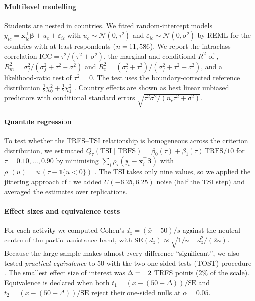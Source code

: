 \documentclass[pdflatex,sn-basic]{sn-jnl}%
\theoremstyle{plain}
\theoremstyle{remark}
\begin{document}
\paragraph{Multilevel modelling} Students are nested in countries. We fitted random-intercept models $y_{ic}=\mathbf{x}_{ic}^{\top}\boldsymbol\beta+u_c+\varepsilon_{ic}$ with $u_c\sim\mathcal N(0,\tau^2)$ and $\varepsilon_{ic}\sim\mathcal N(0,\sigma^2)$ by REML \citep{raudenbush2002} for the \MlCountries{} countries with at least \MlMinN{} respondents ($n=11,586$). We report the intraclass correlation $\mathrm{ICC}=\tau^2/(\tau^2+\sigma^2)$, the marginal and conditional $R^2$ of \citet{nakagawa2013}, $R^2_m=\sigma_f^2/(\sigma_f^2+\tau^2+\sigma^2)$ and $R^2_c=(\sigma_f^2+\tau^2)/(\sigma_f^2+\tau^2+\sigma^2)$, and a likelihood-ratio test of $\tau^2=0$. The test uses the boundary-corrected reference distribution $\tfrac12\chi^2_0+\tfrac12\chi^2_1$ \citep{self1987}. Country effects are shown as best linear unbiased predictors with conditional standard errors $\sqrt{\tau^2\sigma^2/(n_c\tau^2+\sigma^2)}$.

\paragraph{Quantile regression} To test whether the TRFS--TSI relationship is homogeneous across the criterion distribution, we estimated $Q_{\tau}(\mathrm{TSI}\mid\mathrm{TRFS})=\beta_0(\tau)+\beta_1(\tau)\,\mathrm{TRFS}/10$ for $\tau=0.10,\dots,0.90$ by minimising $\sum_i\rho_\tau(y_i-\mathbf{x}_i^{\top}\boldsymbol\beta)$ with $\rho_\tau(u)=u\,(\tau-\mathbb 1\{u<0\})$ \citep{koenker1978}. The TSI takes only nine values, so we applied the jittering approach of \citet{machado2005}: we added $U(-6.25,6.25)$ noise (half the TSI step) and averaged the estimates over \QReps{} replications.

\paragraph{Effect sizes and equivalence tests} For each activity we computed Cohen's $d_z=(\bar x-50)/s$ against the neutral centre of the partial-assistance band, with $\mathrm{SE}(d_z)\approx\sqrt{1/n+d_z^2/(2n)}$. Because the large sample makes almost every difference ``significant'', we also tested \emph{practical equivalence} to 50 with the two one-sided tests (TOST) procedure \citep{schuirmann1987,lakens2017}. The smallest effect size of interest was $\Delta=\pm2$ TRFS points (2\% of the scale). Equivalence is declared when both $t_1=(\bar x-(50-\Delta))/\mathrm{SE}$ and $t_2=(\bar x-(50+\Delta))/\mathrm{SE}$ reject their one-sided nulls at $\alpha=0.05$.
\end{document}
